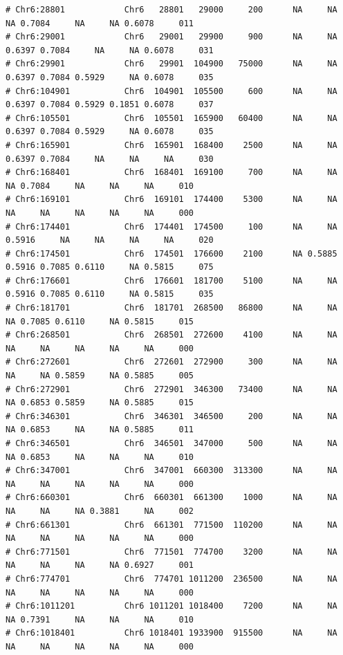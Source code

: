 \documentclass{article}\usepackage[]{graphicx}\usepackage[]{color}
\makeatletter
\newenvironment{kframe}{%
 \def\at@end@of@kframe{}%
 \ifinner\ifhmode%
  \def\at@end@of@kframe{\end{minipage}}%
  \begin{minipage}{\columnwidth}%
 \fi\fi%
 \def\FrameCommand##1{\hskip\@totalleftmargin \hskip-\fboxsep
 \colorbox{shadecolor}{##1}\hskip-\fboxsep
     \hskip-\linewidth \hskip-\@totalleftmargin \hskip\columnwidth}%
 \MakeFramed {\advance\hsize-\width
   \@totalleftmargin\z@ \linewidth\hsize
   \@setminipage}}%
 {\par\unskip\endMakeFramed%
 \at@end@of@kframe}
\newenvironment{knitrout}{}{} %
\makeatother
\begin{document}
\begin{knitrout}
\begin{kframe}
\begin{verbatim}
# Chr6:28801            Chr6   28801   29000     200      NA     NA     NA 0.7084     NA     NA 0.6078     011
# Chr6:29001            Chr6   29001   29900     900      NA     NA 0.6397 0.7084     NA     NA 0.6078     031
# Chr6:29901            Chr6   29901  104900   75000      NA     NA 0.6397 0.7084 0.5929     NA 0.6078     035
# Chr6:104901           Chr6  104901  105500     600      NA     NA 0.6397 0.7084 0.5929 0.1851 0.6078     037
# Chr6:105501           Chr6  105501  165900   60400      NA     NA 0.6397 0.7084 0.5929     NA 0.6078     035
# Chr6:165901           Chr6  165901  168400    2500      NA     NA 0.6397 0.7084     NA     NA     NA     030
# Chr6:168401           Chr6  168401  169100     700      NA     NA     NA 0.7084     NA     NA     NA     010
# Chr6:169101           Chr6  169101  174400    5300      NA     NA     NA     NA     NA     NA     NA     000
# Chr6:174401           Chr6  174401  174500     100      NA     NA 0.5916     NA     NA     NA     NA     020
# Chr6:174501           Chr6  174501  176600    2100      NA 0.5885 0.5916 0.7085 0.6110     NA 0.5815     075
# Chr6:176601           Chr6  176601  181700    5100      NA     NA 0.5916 0.7085 0.6110     NA 0.5815     035
# Chr6:181701           Chr6  181701  268500   86800      NA     NA     NA 0.7085 0.6110     NA 0.5815     015
# Chr6:268501           Chr6  268501  272600    4100      NA     NA     NA     NA     NA     NA     NA     000
# Chr6:272601           Chr6  272601  272900     300      NA     NA     NA     NA 0.5859     NA 0.5885     005
# Chr6:272901           Chr6  272901  346300   73400      NA     NA     NA 0.6853 0.5859     NA 0.5885     015
# Chr6:346301           Chr6  346301  346500     200      NA     NA     NA 0.6853     NA     NA 0.5885     011
# Chr6:346501           Chr6  346501  347000     500      NA     NA     NA 0.6853     NA     NA     NA     010
# Chr6:347001           Chr6  347001  660300  313300      NA     NA     NA     NA     NA     NA     NA     000
# Chr6:660301           Chr6  660301  661300    1000      NA     NA     NA     NA     NA 0.3881     NA     002
# Chr6:661301           Chr6  661301  771500  110200      NA     NA     NA     NA     NA     NA     NA     000
# Chr6:771501           Chr6  771501  774700    3200      NA     NA     NA     NA     NA     NA 0.6927     001
# Chr6:774701           Chr6  774701 1011200  236500      NA     NA     NA     NA     NA     NA     NA     000
# Chr6:1011201          Chr6 1011201 1018400    7200      NA     NA     NA 0.7391     NA     NA     NA     010
# Chr6:1018401          Chr6 1018401 1933900  915500      NA     NA     NA     NA     NA     NA     NA     000

\end{verbatim}
\end{kframe}
\end{knitrout}
\end{document}

